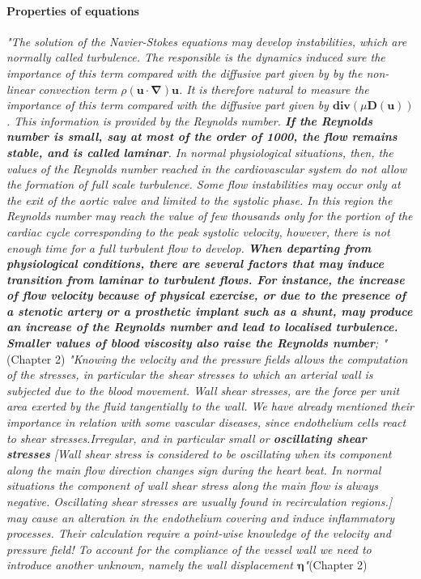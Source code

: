 \documentclass[11pt,letterpaper]{article}
\begin{document}
\paragraph{Properties of equations}\textit{"The solution of the Navier-Stokes equations may develop instabilities,
which are normally called turbulence. The responsible is the dynamics induced sure the importance of this term compared with the diffusive part given by by the non-linear convection term $ \rho (\bm{u} \cdot \bm{\nabla})\bm{u}$. It is therefore natural to measure the importance of this term compared with the diffusive part given by $\bm{div}(\mu \bm{D}(\bm{u}))$. This information is provided by the Reynolds number.  \textbf{If the Reynolds number is small, say at most of the order of 1000, the flow remains stable, and is called laminar}. In normal physiological situations, then, the values of the Reynolds number reached in the cardiovascular system do not allow the formation of full scale turbulence. Some flow instabilities may occur only at the exit of the aortic valve and limited to the systolic phase. In this region the Reynolds number may reach the value of few thousands only for the portion of the cardiac cycle corresponding to the peak systolic velocity, however, there is not enough time for a full turbulent flow to develop. \textbf{When departing from physiological conditions, there are several factors that may induce transition from laminar to turbulent flows. For instance, the increase of flow velocity because of physical exercise, or due to the presence of a stenotic artery or a prosthetic implant such as a shunt, may produce an increase of the Reynolds number and lead to localised turbulence. Smaller values of blood viscosity also raise the Reynolds number}; "}(Chapter 2)
\newline\newline \textit{"Knowing the velocity and the pressure fields allows the computation of the stresses, in particular the shear stresses to which an arterial wall is subjected  due to the blood movement. Wall shear stresses, are the force per unit area exerted by the
fluid tangentially to the wall. We have already mentioned their importance in relation with some vascular diseases, since endothelium cells react to shear stresses.Irregular, and in particular small or \textbf{oscillating shear stresses} \textit{[Wall shear stress is considered to be oscillating when its component along the main flow direction changes sign during the heart beat. In normal situations the component of wall shear stress along the main flow is always negative. Oscillating shear stresses are usually found in recirculation regions.]} may cause an alteration in the endothelium covering and induce inflammatory processes. Their calculation require a point-wise knowledge of the velocity and pressure field! To account for the compliance of the vessel wall we need to introduce
another unknown, namely the wall displacement $\bm{\eta}$"}(Chapter 2)
\end{document}

